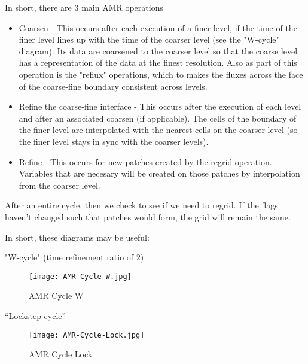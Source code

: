 In short, there are 3 main AMR operations 
\begin{itemize}

\item Coarsen - This occurs after each execution of a finer level, if
  the time of the finer level lines up with the time of the coarser
  level (see the "W-cycle" diagram). Its data are coarsened to the
  coarser level so that the coarse level has a representation of the
  data at the finest resolution. Also as part of this operation is the
  "reflux" operations, which to makes the fluxes across the face of
  the coarse-fine boundary consistent across levels.
\item Refine the coarse-fine interface - This occurs after the
  execution of each level and after an associated coarsen (if
  applicable). The cells of the boundary of the finer level are
  interpolated with the nearest cells on the coarser level (so the
  finer level stays in sync with the coarser levels).
\item Refine - This occurs for new patches created by the regrid
  operation. Variables that are necesary will be created on those
  patches by interpolation from the coarser level. 
\end{itemize}

After an entire cycle, then we check to see if we need to regrid. If the flags haven't changed such that patches would form, the grid will remain the same. 

In short, these diagrams may be useful: 

"W-cycle" (time refinement ratio of 2) 

\begin{figure}[htb]
  \centering
  \texttt{[image: AMR-Cycle-W.jpg]}
  \caption{AMR Cycle W}
  \label{fig:amr2}
\end{figure}

``Lockstep cycle''

\begin{figure}[htb]
  \centering
  \texttt{[image: AMR-Cycle-Lock.jpg]}
  \caption{AMR Cycle Lock}
  \label{fig:amr3}
\end{figure}
